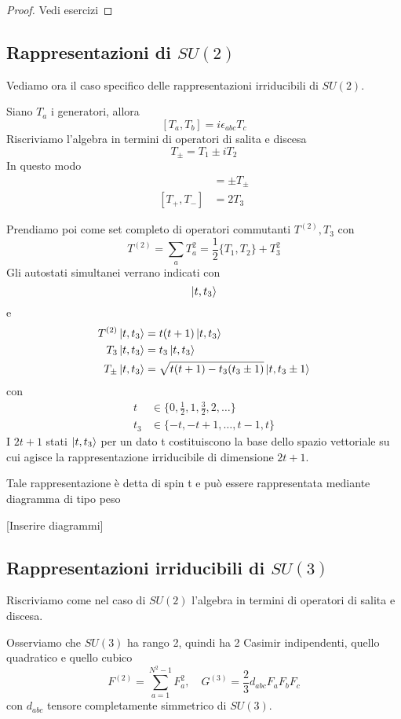 \documentclass[10pt,a4paper]{article}
\theoremstyle{definition}
\begin{document}
\begin{proof}
    Vedi esercizi

\end{proof}

\subsection{Rappresentazioni di $SU(2)$}
Vediamo ora il caso specifico delle rappresentazioni irriducibili di $SU(2)$.

Siano $T_a$ i generatori, allora
\[
[T_a, T_b] = i \epsilon_{abc}T_c    
\]
Riscriviamo l'algebra in termini di operatori di salita e discesa 
\[
T_\pm = T_1 \pm i T_2    
\]
In questo modo
\begin{align*}
[T_3, T_\pm] &= \pm T_\pm  \\  
[T_+, T_-] &= 2T_3    
\end{align*}

Prendiamo poi come set completo di operatori commutanti $T^{(2)}, T_3$ con 
\[
T^{(2)} = \sum_a T_a^2 = \frac12\{T_1, T_2\} + T_3^2    
\]
Gli autostati simultanei verrano indicati con 
\[
\ket{t, t_3}    
\]
e
\begin{align*}
    T^{(2)}\ket{t, t_3}  &= t(t + 1)\ket{t, t_3}  \\
    T_3\ket{t, t_3}  &= t_3\ket{t, t_3}  \\
    T_\pm\ket{t, t_3}  &= \sqrt{t(t + 1) - t_3(t_3 \pm 1)}\ket{t, t_3 \pm 1}  
\end{align*}
con 
\begin{align*}
    t &\in \{0, \frac12, 1, \frac32, 2, \dots\} \\
    t_3 &\in \{-t, -t + 1, \dots, t - 1, t\}
\end{align*}
I $2t + 1$ stati $\ket{t, t_3}$ per un dato t costituiscono la base dello spazio vettoriale su cui agisce la rappresentazione irriducibile di dimensione $2t + 1$.

Tale rappresentazione è detta di spin t e può essere rappresentata mediante diagramma di tipo peso

[Inserire diagrammi]

\subsection{Rappresentazioni irriducibili di $SU(3)$}
Riscriviamo come nel caso di $SU(2)$ l'algebra in termini di operatori di salita e discesa.

Osserviamo che $SU(3)$ ha rango 2, quindi ha 2 Casimir indipendenti, quello quadratico e quello cubico
\[
F^{(2)} = \sum_{a = 1}^{N^2 - 1}F_a^2, \quad G^{(3)} = \frac23 d_{abc}F_aF_bF_c     
\]
con $d_{abc}$ tensore completamente simmetrico di $SU(3)$.
\end{document}
